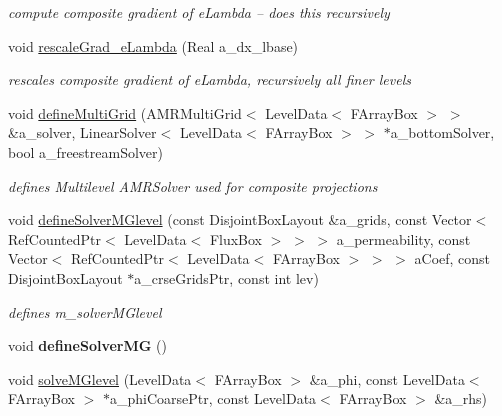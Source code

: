 \begin{DoxyCompactItemize}
\begin{DoxyCompactList}\small\item\em compute composite gradient of e\-Lambda -- does this recursively \end{DoxyCompactList}\item 
void \hyperlink{class_c_c_projector_comp_a8403e4bf94c691ee8069371ba3f0fd47}{rescale\-Grad\-\_\-e\-Lambda} (Real a\-\_\-dx\-\_\-lbase)
\begin{DoxyCompactList}\small\item\em rescales composite gradient of e\-Lambda, recursively all finer levels \end{DoxyCompactList}\item 
void \hyperlink{class_c_c_projector_comp_abf9e2612bd8c307cf253205239c609a2}{define\-Multi\-Grid} (A\-M\-R\-Multi\-Grid$<$ Level\-Data$<$ F\-Array\-Box $>$ $>$ \&a\-\_\-solver, Linear\-Solver$<$ Level\-Data$<$ F\-Array\-Box $>$ $>$ $\ast$a\-\_\-bottom\-Solver, bool a\-\_\-freestream\-Solver)
\begin{DoxyCompactList}\small\item\em defines Multilevel A\-M\-R\-Solver used for composite projections \end{DoxyCompactList}\item 
\hypertarget{class_c_c_projector_comp_a381b83a281c98ec7ea90a5bcd736015a}{void \hyperlink{class_c_c_projector_comp_a381b83a281c98ec7ea90a5bcd736015a}{define\-Solver\-M\-Glevel} (const Disjoint\-Box\-Layout \&a\-\_\-grids, const Vector$<$ Ref\-Counted\-Ptr$<$ Level\-Data$<$ Flux\-Box $>$ $>$ $>$ a\-\_\-permeability, const Vector$<$ Ref\-Counted\-Ptr$<$ Level\-Data$<$ F\-Array\-Box $>$ $>$ $>$ a\-Coef, const Disjoint\-Box\-Layout $\ast$a\-\_\-crse\-Grids\-Ptr, const int lev)}\label{class_c_c_projector_comp_a381b83a281c98ec7ea90a5bcd736015a}

\begin{DoxyCompactList}\small\item\em defines m\-\_\-solver\-M\-Glevel \end{DoxyCompactList}\item 
\hypertarget{class_c_c_projector_comp_a78afc279b79aa92a7be8a6dbc4a2aa90}{void {\bfseries define\-Solver\-M\-G} ()}\label{class_c_c_projector_comp_a78afc279b79aa92a7be8a6dbc4a2aa90}

\item 
\hypertarget{class_c_c_projector_comp_ac873a323f460f6c26990032e87d7e796}{void \hyperlink{class_c_c_projector_comp_ac873a323f460f6c26990032e87d7e796}{solve\-M\-Glevel} (Level\-Data$<$ F\-Array\-Box $>$ \&a\-\_\-phi, const Level\-Data$<$ F\-Array\-Box $>$ $\ast$a\-\_\-phi\-Coarse\-Ptr, const Level\-Data$<$ F\-Array\-Box $>$ \&a\-\_\-rhs)}\label{class_c_c_projector_comp_ac873a323f460f6c26990032e87d7e796}


\end{DoxyCompactItemize}
